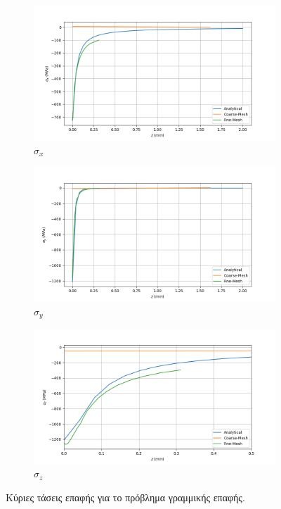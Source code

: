 \documentclass{article}
\begin{document}
\begin{figure}[H]
    \centering
    \begin{subfigure}{0.32\linewidth}
        \centering
        \includegraphics[width=\linewidth]{media/sxlin.png}
        \caption{$\sigma_x$}
    \end{subfigure}
    \hfill
    \begin{subfigure}{0.32\linewidth}
        \centering
        \includegraphics[width= \linewidth]{media/sylin.png}
        \caption{$\sigma_y$}
    \end{subfigure}
    \hfill
    \begin{subfigure}{0.32\linewidth}
        \centering
        \includegraphics[width=\linewidth]{media/szlin.png}
        \caption{$\sigma_z$}
    \end{subfigure}
    \caption{Κύριες τάσεις επαφής για το πρόβλημα γραμμικής επαφής.}
    \label{fig:b3}
\end{figure}
\end{document}
